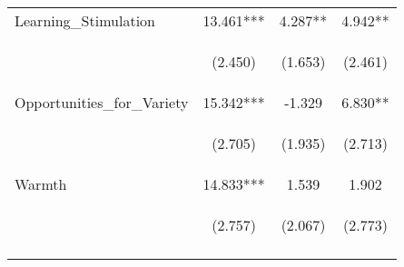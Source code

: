 \begin{tabular}{lccc}
\noalign{\smallskip}Learning_Stimulation & 13.461*** & 4.287** & 4.942**\\
 & \begin{footnotesize}(2.450)\end{footnotesize} & \begin{footnotesize}(1.653)\end{footnotesize} & \begin{footnotesize}(2.461)\end{footnotesize}\\
\noalign{\smallskip}Opportunities_for_Variety & 15.342*** & -1.329 & 6.830**\\
 & \begin{footnotesize}(2.705)\end{footnotesize} & \begin{footnotesize}(1.935)\end{footnotesize} & \begin{footnotesize}(2.713)\end{footnotesize}\\
\noalign{\smallskip}Warmth & 14.833*** & 1.539 & 1.902\\
 & \begin{footnotesize}(2.757)\end{footnotesize} & \begin{footnotesize}(2.067)\end{footnotesize} & \begin{footnotesize}(2.773)\end{footnotesize}\\
\noalign{\smallskip}\hline\end{tabular}\\
